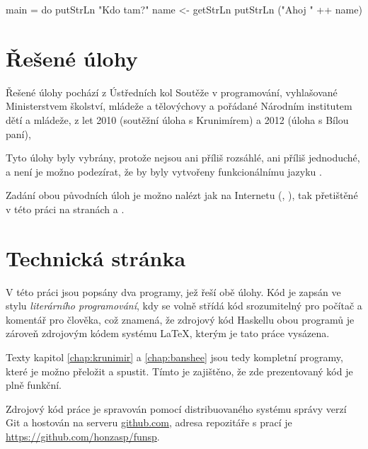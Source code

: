 \begin{haskell}
main = do
  putStrLn "Kdo tam?"
  name <- getStrLn
  putStrLn ("Ahoj " ++ name)
\end{haskell}

\section{Řešené úlohy}

Řešené úlohy pochází z Ústředních kol Soutěže v programování, vyhlašované
Ministerstvem školství, mládeže a tělovýchovy a pořádané Národním institutem
dětí a mládeže, z let 2010 (soutěžní úloha s Krunimírem) a 2012 (úloha s Bílou
paní),

Tyto úlohy byly vybrány, protože nejsou ani příliš rozsáhlé, ani příliš
jednoduché, a není je možno podezírat, že by byly vytvořeny funkcionálnímu jazyku
.

Zadání obou původních úloh je možno nalézt jak na Internetu
(\cite{krunimir-task}, \cite{banshee-task}), tak přetištěné v této práci na
stranách \pageref{pdf:krunimir} a \pageref{pdf:banshee}.

\section{Technická stránka}

V této práci jsou popsány dva programy, jež řeší obě úlohy. Kód je zapsán ve
stylu \emph{literárního programování}, kdy se volně střídá kód srozumitelný pro
počítač a komentář pro člověka, což znamená, že zdrojový kód Haskellu obou
programů je zároveň zdrojovým kódem systému \LaTeX, kterým je tato práce
vysázena.

Texty kapitol \ref{chap:krunimir} a \ref{chap:banshee} jsou tedy kompletní
programy, které je možno přeložit a spustit. Tímto je zajištěno, že zde
prezentovaný kód je plně funkční.

Zdrojový kód práce je spravován pomocí distribuovaného systému správy verzí Git
a hostován na serveru \href{http://github.com}{github.com}, adresa repozitáře s
prací je \url{https://github.com/honzasp/funsp}.
